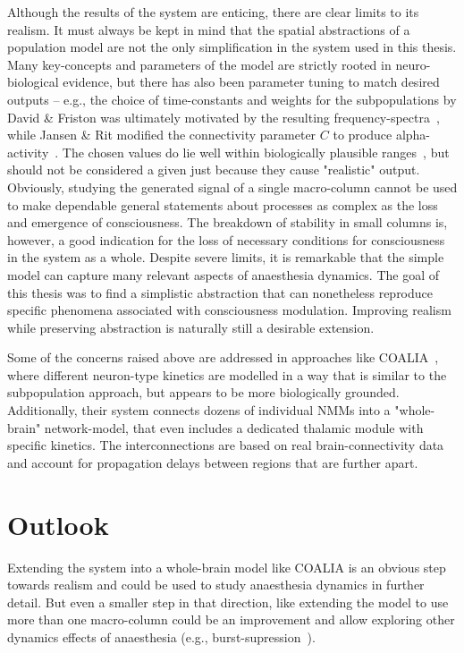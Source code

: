 Although the results of the system are enticing,
there are clear limits to its realism.
It must always be kept in mind that the spatial abstractions of a
population model are not the only simplification in the system used in this thesis.
Many key-concepts and parameters of the model are strictly rooted in neuro-biological evidence,
but there has also been parameter tuning to match desired outputs -- e.g., the choice of time-constants and weights for
the subpopulations by David \& Friston was ultimately motivated by the
resulting frequency-spectra~\cite{david_neural_2003},
while Jansen \& Rit modified the connectivity parameter $C$ to produce
alpha-activity~\cite{jansen_electroencephalogram_1995}.
The chosen values do lie well within biologically plausible ranges~\cite{gulledge_synaptic_2005},
but should not be considered a given just because they cause "realistic" output.
Obviously, studying the generated signal of a single macro-column cannot be used to make dependable
general statements about processes as complex as the loss and emergence of consciousness.
The breakdown of stability in small columns is, however, a good indication for the loss of necessary
conditions for consciousness in the system as a whole.
Despite severe limits,
it is remarkable that the simple model can capture many relevant aspects of anaesthesia dynamics.
The goal of this thesis was to find a simplistic abstraction that can nonetheless reproduce specific phenomena
associated with consciousness modulation.
Improving realism while preserving abstraction is naturally still a desirable extension.

Some of the concerns raised above are addressed in approaches like COALIA~\cite{bensaid_coalia_2019},
where different neuron-type kinetics are modelled in a way that is similar to the subpopulation approach,
but appears to be more biologically grounded.
Additionally, their system connects dozens of individual NMMs into a "whole-brain" network-model,
that even includes a dedicated thalamic module with specific kinetics.
The interconnections are based on real brain-connectivity data and account for propagation delays
between regions that are further apart.

\section{Outlook}
Extending the system into a whole-brain model like COALIA is an obvious step towards realism and could be used to
study anaesthesia dynamics in further detail.
But even a smaller step in that direction,
like extending the model to use more than one macro-column could be an improvement and allow exploring other
dynamics effects of anaesthesia (e.g., burst-supression~\cite{bojak_emergence_2015}).

